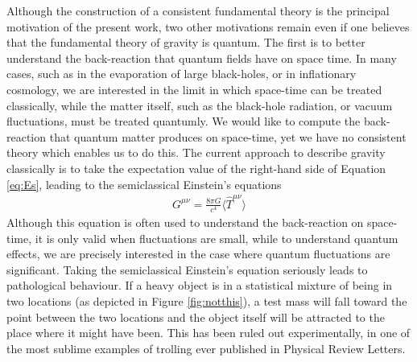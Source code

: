 \documentclass[aps,pra,showpacs,citeautoscript,amsmath,amssymb,floatfix,superscriptaddress,bbm, verbatim,amsfonts,changes,12pt,nofootinbib,longbibliography]{revtex4-2}
\begin{document}
Although the construction of a consistent fundamental theory is the principal motivation of the present work, two other motivations remain even if one believes that the fundamental theory of gravity is quantum. The first is to better understand the back-reaction that quantum fields have on space time. In many cases, such as in the evaporation of large black-holes, or in inflationary cosmology, we are interested in the limit in which space-time can be treated classically, while the matter itself, such as the black-hole radiation, or vacuum fluctuations, must be treated quantumly. We would like to compute the back-reaction that quantum matter produces on space-time, yet we have no consistent theory which enables us to do this. The current approach to describe gravity classically is to take the expectation value of the right-hand side of Equation \eqref{eq:Es}, leading to the  semiclassical Einstein's %
equations\cite{sato1950attempt,moller1962energy,rosenfeld1963quantization}
\begin{align}
G^{\mu\nu}
=\frac{8\pi G}{c^4}\langle{\hat T}^{\mu\nu}\rangle
\label{eq:semi}
\end{align}
Although this equation is often used to understand the back-reaction on space-time, it is only valid when fluctuations are small, while to understand quantum effects, we are precisely interested in the case where quantum fluctuations are significant. 
Taking the semiclassical Einstein's equation seriously leads to pathological behaviour. If a heavy object is in a statistical mixture of being in two locations (as depicted in Figure \ref{fig:notthis}), a test mass will fall toward the point between the two locations and the object itself will be attracted to the place where it might have been. This has been ruled out experimentally, in one of the most sublime  examples of trolling ever published in Physical Review Letters\cite{page1981indirect}. %
\end{document}
